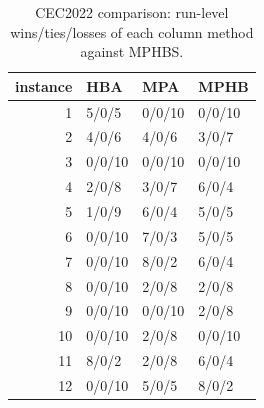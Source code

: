 \begin{table}[t]
\centering
\scriptsize
\caption{CEC2022 comparison: run-level wins/ties/losses of each column method against MPHBS.}
\label{tab:cec2022_comparison_wtl}
\begin{tabular}{rlll}
\toprule
instance & HBA & MPA & MPHB \\
\midrule
1 & 5/0/5 & 0/0/10 & 0/0/10 \\
2 & 4/0/6 & 4/0/6 & 3/0/7 \\
3 & 0/0/10 & 0/0/10 & 0/0/10 \\
4 & 2/0/8 & 3/0/7 & 6/0/4 \\
5 & 1/0/9 & 6/0/4 & 5/0/5 \\
6 & 0/0/10 & 7/0/3 & 5/0/5 \\
7 & 0/0/10 & 8/0/2 & 6/0/4 \\
8 & 0/0/10 & 2/0/8 & 2/0/8 \\
9 & 0/0/10 & 0/0/10 & 2/0/8 \\
10 & 0/0/10 & 2/0/8 & 0/0/10 \\
11 & 8/0/2 & 2/0/8 & 6/0/4 \\
12 & 0/0/10 & 5/0/5 & 8/0/2 \\
\bottomrule
\end{tabular}
\end{table}
